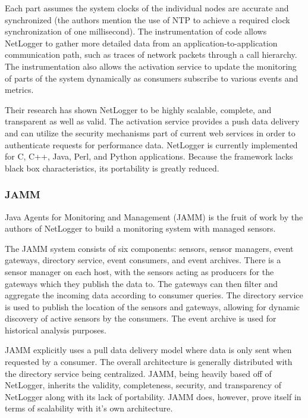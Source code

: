Each part assumes the system clocks of the individual nodes are accurate and synchronized (the authors mention the use
of NTP to achieve a required clock synchronization of one millisecond). The instrumentation of code allows NetLogger to
gather more detailed data from an application-to-application communication path, such as traces of network packets
through a call hierarchy. The instrumentation also allows the activation service to update the monitoring of parts of
the system dynamically as consumers subscribe to various events and metrics.

Their research has shown NetLogger to be highly scalable, complete, and transparent as well as valid. The activation
service provides a push data delivery and can utilize the security mechanisms part of current web services in order to
authenticate requests for performance data. NetLogger is currently implemented for C, C++, Java, Perl, and Python
applications. Because the framework lacks black box characteristics, its portability is greatly reduced.

\subsubsection{JAMM}

Java Agents for Monitoring and Management (JAMM) \cite{tierney2000} is the fruit of work by the authors of NetLogger to
build a monitoring system with managed sensors. 

The JAMM system consists of six components: sensors, sensor managers, event gateways, directory service, event
consumers, and event archives. There is a sensor manager on each host, with the sensors acting as producers for the
gateways which they publish the data to. The gateways can then filter and aggregate the incoming data according to
consumer queries. The directory service is used to publish the location of the sensors and gateways, allowing for
dynamic discovery of active sensors by the consumers. The event archive is used for historical analysis purposes.

JAMM explicitly uses a pull data delivery model where data is only sent when requested by a consumer. The overall
architecture is generally distributed with the directory service being centralized. JAMM, being heavily based off of
NetLogger, inherits the validity, completeness, security, and transparency of NetLogger along with its lack of
portability. JAMM does, however, prove itself in terms of scalability with it's own architecture.

